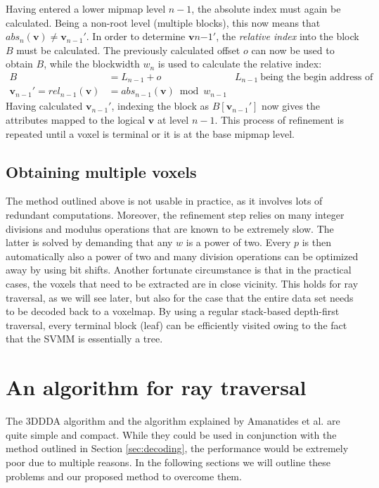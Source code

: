Having entered a lower mipmap level $n-1$, the absolute index must again be calculated. Being a non-root level (multiple blocks), this now means that $ \textit{abs}_n(\mathbf{v}) \neq \mathbf{v}_{n-1}'$. In order to determine $\mathbf{v}n{-1}'$, the \emph{relative index} into the block $B$ must be calculated. The previously calculated offset $o$ can now be used to obtain $B$, while the blockwidth $w_n$ is used to calculate the relative index:
\begin{align*}
B &= L_{n-1} + o & L_{n-1} \ \text{being the begin address of level n-1}\\
\mathbf{v}_{n-1}' = \textit{rel}_{n-1}(\mathbf{v}) &= \textit{abs}_{n-1}(\mathbf{v})  \bmod  w_{n-1}
\end{align*}
Having calculated $\mathbf{v}_{n-1}'$, indexing the block as $B[\mathbf{v}_{n-1}']$ now gives the attributes mapped to the logical $\mathbf{v}$ at level $n-1$. This process of refinement is repeated until a voxel is terminal or it is at the base mipmap level.
%
\subsection{Obtaining multiple voxels} \label{sec:multiplevoxels}
%
The method outlined above is not usable in practice, as it involves lots of redundant computations. Moreover, the refinement step relies on many integer divisions and modulus operations that are known to be extremely slow. The latter is solved by demanding that any $w$ is a power of two. Every $p$ is then automatically also a power of two and many division operations can be optimized away by using bit shifts. Another fortunate circumstance is that in the practical cases, the voxels that need to be extracted are in close vicinity. This holds for ray traversal, as we will see later, but also for the case that the entire data set needs to be decoded back to a voxelmap. By using a regular stack-based depth-first traversal, every terminal block (leaf) can be efficiently visited owing to the fact that the SVMM is essentially a tree.
%
\section{An algorithm for ray traversal}
%
The 3DDDA algorithm and the algorithm explained by Amanatides et al.\cite{amanatides84} are quite simple and compact. While they could be used in conjunction with the method outlined in Section \ref{sec:decoding}, the performance would be extremely poor due to multiple reasons. In the following sections we will outline these problems and our proposed method to overcome them. 
%

